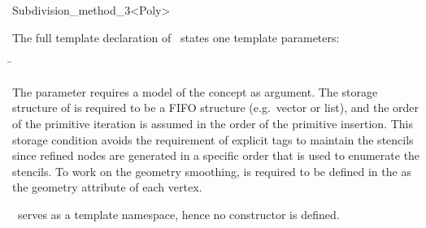 \begin{ccRefClass}{Subdivision_method_3<Poly>}


\ccParameters

The full template declaration of \ccClassTemplateName\ states one
template parameters:

\begin{tabbing}
 \= 
\end{tabbing}
   
The parameter  requires a model of 
the  concept as argument. The storage structure
of  is required to be a FIFO structure (e.g.~vector 
or list), and the order of the primitive iteration is assumed in the order
of the primitive insertion. This storage condition avoids the requirement 
of explicit tags to maintain the stencils since refined nodes are 
generated in a specific order that is used to enumerate the stencils. 
To work on the geometry smoothing, 
 is required to be defined in the  as the 
geometry attribute of each vertex.








\ccCreation
{}

\ccClassTemplateName\ serves as a template namespace, hence no constructor
is defined. 




\end{ccRefClass}

